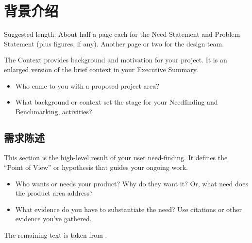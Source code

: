 \chapter{背景介绍}
\label{sec-context} %

\begin{remark} \color{blue}
Suggested length: About half a page each for the Need Statement and Problem Statement (plus figures, if any). Another page or two for the design team.
\vspace{0.1in}

\noindent The Context provides background and motivation for your project. It is an enlarged version of the brief context in your Executive Summary.  
\begin{itemize} \tightlist
\item Who came to you with a proposed project area? 
\item What background or context set the stage for your Needfinding and Benchmarking, activities?
\end{itemize}
\normalcolor \end{remark}

\section{需求陈述}
\label{sec:need}

\begin{remark} \color{blue}
This section is the high-level result of your user need-finding. It defines the ``Point of View'' or hypothesis that guides your ongoing work. 
\begin{itemize} \tightlist
\item Who wants or needs your product? Why do they want it? Or, what need does the product area address? 
\item What evidence do you have to substantiate the need? Use citations or other evidence you've gathered.
\end{itemize}
\noindent The remaining text is taken from \cite{Autodesk2008Fall}.
\normalcolor
\end{remark}


